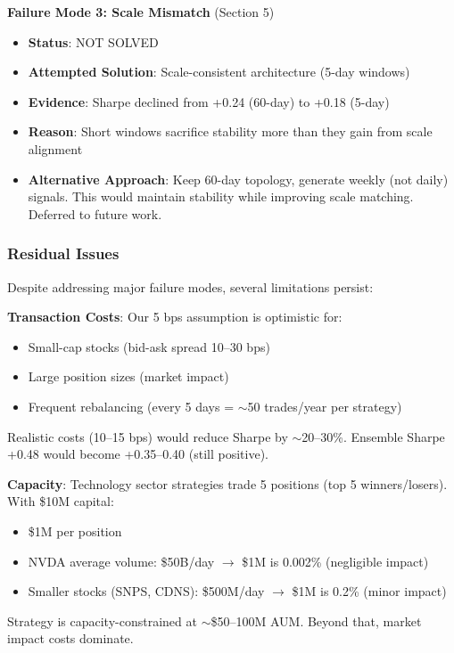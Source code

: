 \textbf{Failure Mode 3: Scale Mismatch} (Section 5)
\begin{itemize}
\item \textbf{Status}: NOT SOLVED
\item \textbf{Attempted Solution}: Scale-consistent architecture (5-day windows)
\item \textbf{Evidence}: Sharpe declined from +0.24 (60-day) to +0.18 (5-day)
\item \textbf{Reason}: Short windows sacrifice stability more than they gain from scale alignment
\item \textbf{Alternative Approach}: Keep 60-day topology, generate weekly (not daily) signals. This would maintain stability while improving scale matching. Deferred to future work.
\end{itemize}

\subsubsection{Residual Issues}

Despite addressing major failure modes, several limitations persist:

\textbf{Transaction Costs}: Our 5 bps assumption is optimistic for:
\begin{itemize}
\item Small-cap stocks (bid-ask spread 10--30 bps)
\item Large position sizes (market impact)
\item Frequent rebalancing (every 5 days = $\sim$50 trades/year per strategy)
\end{itemize}

Realistic costs (10--15 bps) would reduce Sharpe by $\sim$20--30\%. Ensemble Sharpe +0.48 would become +0.35--0.40 (still positive).

\textbf{Capacity}: Technology sector strategies trade 5 positions (top 5 winners/losers). With \$10M capital:
\begin{itemize}
\item \$1M per position
\item NVDA average volume: \$50B/day $\rightarrow$ \$1M is 0.002\% (negligible impact)
\item Smaller stocks (SNPS, CDNS): \$500M/day $\rightarrow$ \$1M is 0.2\% (minor impact)
\end{itemize}

Strategy is capacity-constrained at $\sim$\$50--100M AUM. Beyond that, market impact costs dominate.

